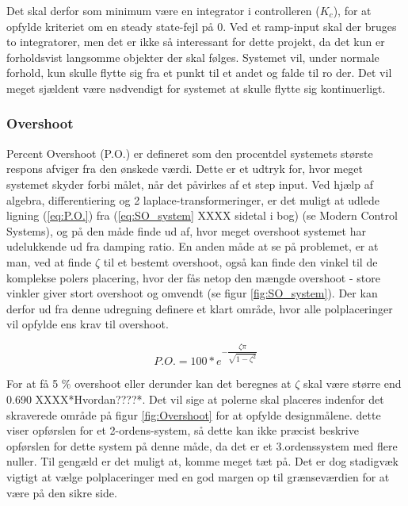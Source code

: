 Det skal derfor som minimum være en integrator i controlleren ($K_{c}$), for at opfylde kriteriet om en steady state-fejl på 0. Ved et ramp-input skal der bruges to integratorer, men det er ikke så interessant for dette projekt, da det kun er forholdsvist langsomme objekter der skal følges. Systemet vil, under normale forhold, kun skulle flytte sig fra et punkt til et andet og falde til ro der. Det vil meget sjældent være nødvendigt for systemet at skulle flytte sig kontinuerligt.

\subsubsection{Overshoot}

Percent Overshoot (P.O.) er defineret som den procentdel systemets største respons afviger fra den ønskede værdi. Dette er et udtryk for, hvor meget systemet skyder forbi målet, når det påvirkes af et step input. Ved hjælp af algebra, differentiering og 2 laplace-transformeringer, er det muligt at udlede ligning (\ref{eq:P.O.}) fra (\ref{eq:SO_system} XXXX sidetal i bog) (se Modern Control Systems\cite{ModernControlSystem}), og på den måde finde ud af, hvor meget overshoot systemet har udelukkende ud fra damping ratio. En anden måde at se på problemet, er at man, ved at finde $\zeta$ til et bestemt overshoot, også kan finde den vinkel til de komplekse polers placering, hvor der fås netop den mængde overshoot - store vinkler giver stort overshoot og omvendt (se figur \ref{fig:SO_system}). Der kan derfor ud fra denne udregning definere et klart område, hvor alle polplaceringer vil opfylde ens krav til overshoot. 

\begin{equation}\label{eq:P.O.}
P.O.=100*e^{-\dfrac{\zeta\pi}{\sqrt{1-\zeta^2}}}
\end{equation}

For at få 5 $\%$ overshoot eller derunder kan det beregnes at $\zeta$ skal være større end 0.690 XXXX*Hvordan????*. Det vil sige at polerne skal placeres indenfor det skraverede område på figur \ref{fig:Overshoot} for at opfylde designmålene. dette viser opførslen for et 2-ordens-system, så dette kan ikke præcist beskrive opførslen for dette system på denne måde, da det er et 3.ordenssystem med flere nuller. Til gengæld er det muligt at, komme meget tæt på. Det er dog stadigvæk vigtigt at vælge polplaceringer med en god margen op til grænseværdien for at være på den sikre side.

